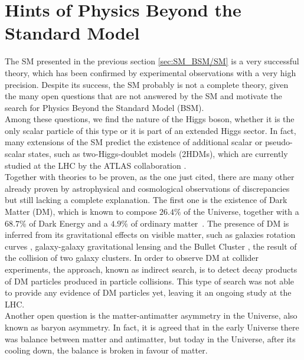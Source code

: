 
\section{Hints of Physics Beyond the Standard Model}\label{sec:SM_BSM/BSM}

The SM presented in the previous section \ref{sec:SM_BSM/SM} is a very successful theory, which has been confirmed by experimental observations with a very high precision.
Despite its success, the SM probably is not a complete theory, given the many open questions that are not answered by the SM and motivate the search for Physics Beyond the Standard Model (BSM).\\
Among these questions, we find the nature of the Higgs boson, whether it is the only scalar particle of this type or it is part of an extended Higgs sector. In fact, many extensions of the SM predict the existence of additional scalar or pseudo-scalar states, such as two-Higgs-doublet models (2HDMs), which are currently studied at the LHC by the ATLAS collaboration \cite{Higgs_extended_ATLAS}.\\
Together with theories to be proven, as the one just cited, there are many other already proven by astrophysical and cosmological observations of discrepancies but still lacking a complete explanation. 
The first one is the existence of Dark Matter (DM), which is known to compose $26.4\%$ of the Universe, together with a $68.7\%$ of Dark Energy and a $4.9\%$ of ordinary matter~\cite{cirelli_DM}. 
The presence of DM is inferred from its gravitational effects on visible matter, such as galaxies rotation curves \cite{Hubble_GalRot}, galaxy-galaxy gravitational lensing \cite{GalaxyLensing} and the Bullet Cluster \cite{Cluster_DM}, the result of the collision of two galaxy clusters. 
In order to observe DM at collider experiments, the approach, known as indirect search, is to detect decay products of DM particles produced in particle collisions. 
This type of search was not able to provide any evidence of DM particles yet, leaving it an ongoing study at the LHC.\\
Another open question is the matter-antimatter asymmetry in the Universe, also known as baryon asymmetry. 
In fact, it is agreed that in the early Universe there was balance between matter and antimatter, but today in the Universe, after its cooling down, the balance is broken in favour of matter. 
